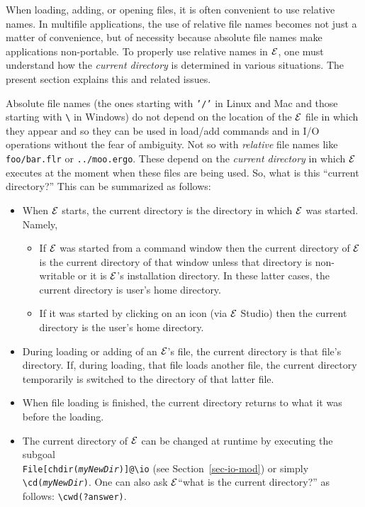 \documentclass[11pt]{article}
\newcommand{\ERGO}{\mbox{\ensuremath{\cal{E}}\smaller{{\sc{RGO}}}}\xspace}
\newcommand{\FLSYSTEM}{\ERGO}
\newcommand{\bs}{\textbackslash}
\begin{document}
When loading, adding, or opening files, it is often convenient to use
relative names. In multifile applications, the use of relative file names
becomes not just a matter of convenience, but of necessity because absolute
file names make applications non-portable. To properly use relative names in
\FLSYSTEM, one must understand how the \emph{current directory}
is determined in various situations. The present
section explains this and related issues.

Absolute file names (the ones starting with \texttt{'/'} in Linux and Mac
and those starting with \texttt{\bs} in Windows) 
do not depend on the location of the \FLSYSTEM file in which they appear
and so they can be used in load/add commands
and in I/O operations without the fear
of ambiguity. Not so with \emph{relative} file names like
\texttt{foo/bar.flr} or \texttt{../moo.ergo}. These depend on the \emph{current
directory} in which \FLSYSTEM executes at the moment when these files are
being used. So, what is this ``current directory?''     
This can be summarized as follows:
\begin{itemize}
\item  When \FLSYSTEM starts, the current directory is the directory in
  which \FLSYSTEM was started. Namely,
  \begin{itemize}
  \item If \FLSYSTEM was started from a command
    window then the current directory of \FLSYSTEM is the current directory
    of that window unless that directory is non-writable or it is \FLSYSTEM's
    installation directory. In these latter cases,  the current
    directory is user's home directory.
  \item If it was started by clicking on an icon (via \ERGO
    Studio) then the current directory is the user's home directory.
  \end{itemize}
\item During loading or adding of an \FLSYSTEM's file, the current
  directory is that file's directory. If, during loading, that file loads
  another file, the current directory temporarily is switched to the
  directory of that latter file.
\item  When file loading is finished, the current directory returns to what it was
  before the loading.
\item The current directory of \FLSYSTEM
  can be changed at runtime by executing the subgoal\\
  \index{\bs{}cwd}
  \index{\bs{}cd}
  \texttt{File[chdir(\emph{myNewDir})]@\bs{}io} (see
  Section~\ref{sec-io-mod}) or simply \texttt{\bs{}cd(\emph{myNewDir})}.  
  One can also ask \ERGO ``what is the current directory?'' as follows:
  \texttt{\bs{}cwd(?answer)}. 
\end{itemize}
\end{document}
